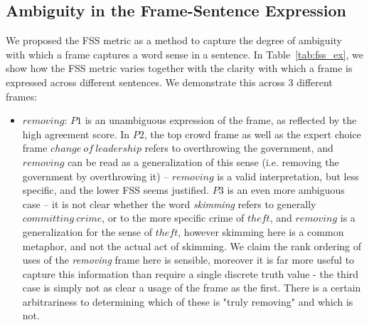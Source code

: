 \subsection{Ambiguity in the Frame-Sentence Expression}

We proposed the FSS metric as a method to capture the degree of ambiguity with which a frame captures a word sense in a sentence. In Table~\ref{tab:fss_ex}, we show how the FSS metric varies together with the clarity with which a frame is expressed across different sentences. We demonstrate this across 3 different frames:

\begin{itemize}

\item $removing$: $P1$ is an unambiguous expression of the frame, as reflected by the high agreement score. In $P2$, the top crowd frame as well as the expert choice frame $change\ of\ leadership$ refers to overthrowing the government, and $removing$ can be read as a generalization of this sense (i.e. removing the government by overthrowing it) -- $removing$ is a valid interpretation, but less specific, and the lower FSS seems justified. $P3$ is an even more ambiguous case -- it is not clear whether the word \textit{skimming} refers to generally $committing\ crime$, or to the more specific crime of $theft$, and $removing$ is a generalization for the sense of $theft$, however skimming here is a common metaphor, and not the actual act of skimming. We claim the rank ordering of uses of the \textit{removing} frame here is sensible, moreover it is far more useful to capture this information than require a single discrete truth value - the third case is simply not as clear a usage of the frame as the first.  There is a certain arbitrariness to determining which of these is "truly removing" and which is not.


\begin{table}[tbh!]
\centering

\end{table}
\end{itemize}
